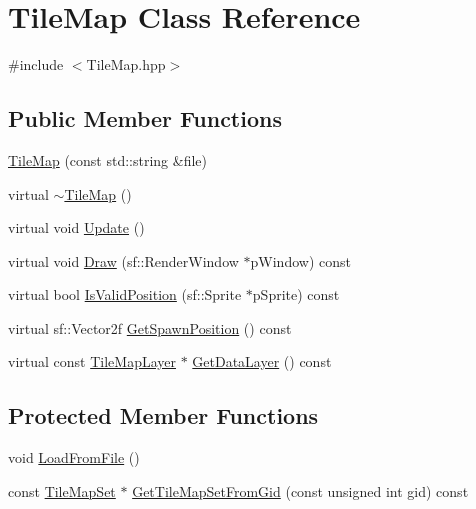 \hypertarget{class_tile_map}{\section{Tile\-Map Class Reference}
\label{class_tile_map}
}


{\ttfamily \#include $<$Tile\-Map.\-hpp$>$}

\subsection*{Public Member Functions}
\begin{DoxyCompactItemize}
\item 
\hyperlink{class_tile_map_a4914f83099a0cd9b71b0ab9a665956c5}{Tile\-Map} (const std\-::string \&file)
\item 
virtual \hyperlink{class_tile_map_a3448728e45d6a43fff3a02d4c6d72e9d}{$\sim$\-Tile\-Map} ()
\item 
virtual void \hyperlink{class_tile_map_a03106c4fd480ab81782778a28af5484f}{Update} ()
\item 
virtual void \hyperlink{class_tile_map_adc7449af6dab5033f9af54b85f2dd8b1}{Draw} (sf\-::\-Render\-Window $\ast$p\-Window) const 
\item 
virtual bool \hyperlink{class_tile_map_abf04fac57f31135e607b0cd23bb4de1c}{Is\-Valid\-Position} (sf\-::\-Sprite $\ast$p\-Sprite) const 
\item 
virtual sf\-::\-Vector2f \hyperlink{class_tile_map_a31c15d30a5d05e3667bd37d5e46c5b56}{Get\-Spawn\-Position} () const 
\item 
virtual const \hyperlink{class_tile_map_layer}{Tile\-Map\-Layer} $\ast$ \hyperlink{class_tile_map_a8b501e63e2e7040a41b65d489a77dfaf}{Get\-Data\-Layer} () const 
\end{DoxyCompactItemize}
\subsection*{Protected Member Functions}
\begin{DoxyCompactItemize}
\item 
void \hyperlink{class_tile_map_a04a757f8848ecfb120324b1225b5622c}{Load\-From\-File} ()
\item 
const \hyperlink{class_tile_map_set}{Tile\-Map\-Set} $\ast$ \hyperlink{class_tile_map_a103bc4ec51b473b430bb859b1d5a215e}{Get\-Tile\-Map\-Set\-From\-Gid} (const unsigned int gid) const 
\end{DoxyCompactItemize}
